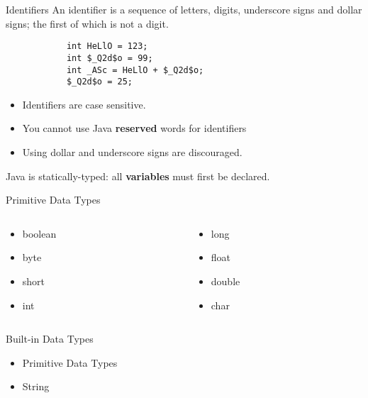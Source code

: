 \documentclass[10pt, compress]{beamer}
\begin{document}
\begin{slide}
	\begin{block}{Identifiers}
		An identifier is a sequence of letters, digits, underscore signs and dollar signs; the first of which is not a digit.
		\begin{verbatim}
			int HeLlO = 123;
			int $_Q2d$o = 99;
			int _ASc = HeLlO + $_Q2d$o;
			$_Q2d$o = 25;
		\end{verbatim}
	\end{block}
	\begin{itemize}
		\item[] Identifiers are case sensitive.
		\item[] You cannot use Java \textbf{reserved} words for identifiers
		\item[] Using dollar and underscore signs are discouraged.
	\end{itemize}
\end{slide}

\begin{slide}
	Java is statically-typed: all \textbf{variables} must first be declared.
	\begin{block}{Primitive Data Types}
		\begin{columns}
		\begin{column}{0.5\textwidth}
			\begin{itemize}
				\item[] boolean
				\item[] byte
				\item[] short
				\item[] int
			\end{itemize}
		\end{column}
		\begin{column}{0.5\textwidth}
			\begin{itemize}
				\item[] long
				\item[] float
				\item[] double
				\item[] char
			\end{itemize}
		\end{column}
		\end{columns}
	\end{block}
	\begin{block}{Built-in Data Types}
		\begin{itemize}
			\item[] Primitive Data Types
			\item[] String
		\end{itemize}
	\end{block}
\end{slide}
\end{document}
